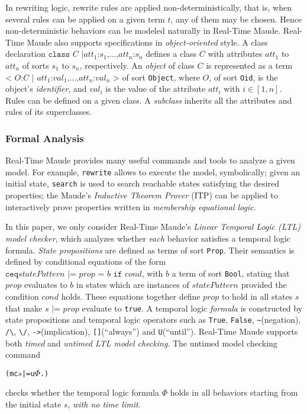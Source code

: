 \documentclass[10pt,journal]{IEEEtran}
\begin{document}
{In rewriting logic, rewrite rules are applied non-deterministically,
that is, when several rules can be applied on a given term $t$, any of
them may be chosen. Hence non-deterministic behaviors can be modeled
naturally in Real-Time Maude.  Real-Time Maude also supports
specifications in \emph{object-oriented} style.  A class declaration
$\texttt{class }C\texttt{ |
}att_1\texttt{:}s_1\texttt{,}\ldots\texttt{,}att_n\texttt{:}s_n$
defines a class $C$ with attributes $att_1$ to $att_n$ of sorts $s_1$
to $s_n$, respectively. An \emph{object} of class $C$ is represented
as a term $\texttt{< } O\texttt{:} C \texttt{ | }
att_1\texttt{:}val_1\texttt{,} \ldots
\texttt{,}att_n\texttt{:}val_n\texttt{ >}$ of sort \verb|Object|,
where $O$, of sort \verb|Oid|, is the object's \emph{identifier}, and
$val_i$ is the value of the attribute $att_i$ with $i\in [1,n]$. Rules
can be defined on a given class. A \emph{subclass} inherits all the
attributes and rules of its superclasses.

\subsubsection{Formal Analysis}
Real-Time Maude provides many useful commands and tools to analyze a
given model. For example, \verb|rewrite| allows to execute the model,
symbolically; given an initial state, \verb|search| is used to search
reachable states satisfying the desired properties; the Maude's
\emph{Inductive Theorem Prover} (ITP) can be applied to interactively
prove properties written in \emph{membership equational logic}.

In this paper, we only consider Real-Time Maude's \emph{Linear
  Temporal Logic (LTL) model checker}, which analyzes whether
\emph{each} behavior satisfies a temporal logic formula. \emph{State
  propositions} are defined as terms of sort \verb|Prop|. Their
semantics is defined by conditional equations of the form $\texttt{ceq
} statePattern \texttt{ |= } prop \texttt{ = } b \texttt{ if } cond$,
with $b$ a term of sort \verb|Bool|, stating that $prop$ evaluates to
$b$ in states which are instances of $statePattern$ provided the
condition $cond$ holds. These equations together define $prop$ to hold
in all states $s$ that make $s \texttt{ |= } prop$ evaluate to
\verb|true|. A temporal logic \emph{formula} is constructed by state
propositions and temporal logic operators such as \verb|True|,
\verb|False|, \verb|~|(negation), \verb|/\|, \verb|\/|,
\verb|->|(implication), \verb|[]|(``always'') and
\verb|U|(``until''). Real-Time Maude supports both \emph{timed} and
\emph{untimed LTL model checking}. The untimed model checking command
\begin{alltt}
  (mc \(s\) |=u \(\Phi\) .)
\end{alltt}
checks whether the temporal logic formula $\Phi$ holds in all
behaviors starting from the initial state $s$, \emph{with no time
  limit}.


}
\end{document}
